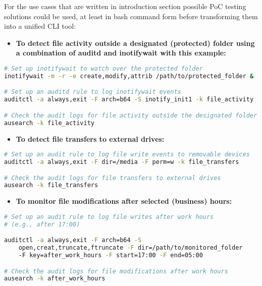 \documentclass{VUMIFPSmagistrinis}
\begin{document}
For the use cases that are written in introduction section possible PoC testing solutions could be used, at least in bash command form before transforming them into a unified CLI tool:
\begin{itemize}
    \item \textbf{To detect file activity outside a designated (protected) folder using a combination of auditd and inotifywait with this example:}
\end{itemize}
\begin{lstlisting}[language=bash]
# Set up inotifywait to watch over the protected folder
inotifywait -m -r -e create,modify,attrib /path/to/protected_folder &

# Set up an auditd rule to log inotifywait events
auditctl -a always,exit -F arch=b64 -S inotify_init1 -k file_activity

# Check the audit logs for file activity outside the designated folder
ausearch -k file_activity
\end{lstlisting}

\begin{itemize}
    \item \textbf{To detect file transfers to external drives:}
\end{itemize}
\begin{lstlisting}[language=bash]
# Set up an audit rule to log file write events to removable devices
auditctl -a always,exit -F dir=/media -F perm=w -k file_transfers

# Check the audit logs for file transfers to external drives
ausearch -k file_transfers
\end{lstlisting}

\begin{itemize}
    \item \textbf{To monitor file modifications after selected (business) hours:}
\end{itemize}
\begin{lstlisting}[language=bash]
# Set up an audit rule to log file writes after work hours 
# (e.g., after 17:00)

auditctl -a always,exit -F arch=b64 -S 
    open,creat,truncate,ftruncate -F dir=/path/to/monitored_folder 
    -F key=after_work_hours -F start=17:00 -F end=05:00

# Check the audit logs for file modifications after work hours
ausearch -k after_work_hours
\end{lstlisting}


	

	






		
\pagebreak
\printbibliography[heading=bibintoc] 
\end{document}
